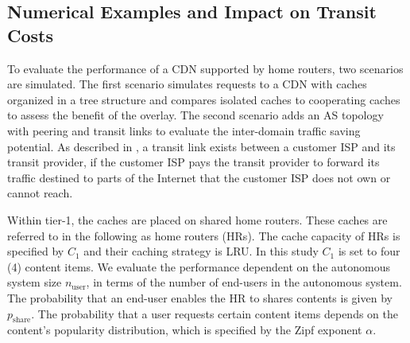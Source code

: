\subsection{Numerical Examples and Impact on Transit Costs}\label{sec:hierarchical:simulative:evaluation}

To evaluate the performance of a CDN supported by home routers, two scenarios are simulated. The first scenario simulates requests to a CDN with caches organized in a tree structure and compares isolated caches to cooperating caches to assess the benefit of the overlay.
The second scenario adds an AS topology with peering and transit links to evaluate the inter-domain traffic saving potential.
As described in , a transit link exists between a customer ISP and its transit provider, if the customer ISP pays the transit provider to forward its traffic destined to parts of the Internet that the customer ISP does not own or cannot reach.

Within tier-1, the caches are placed on shared home routers. These caches are referred to in the following as home routers (HRs). The cache capacity of HRs is specified by $C_1$ and their caching strategy is LRU. In this study $C_1$ is set to four (4) content items.
We evaluate the performance dependent on the autonomous system size $n_\text{user}$, in terms of the number of end-users in the autonomous system. The probability that an end-user enables the HR to shares contents is given by $p_\text{share}$. The probability that a user requests certain content items depends on the content's popularity distribution, which is specified by the Zipf exponent $\alpha$.


